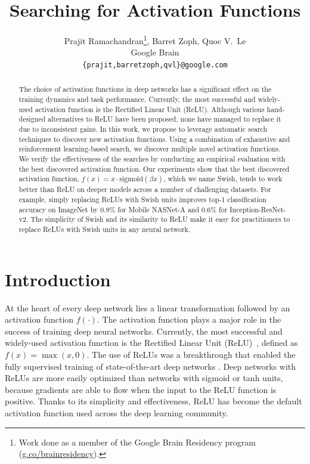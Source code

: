 \documentclass{article} %
\title{Searching for Activation Functions}
\author{Prajit Ramachandran\thanks{Work done as a member of the Google Brain Residency program (\url{g.co/brainresidency}).}, Barret Zoph, Quoc V.~Le  \\
Google Brain \\
\texttt{\{prajit,barretzoph,qvl\}@google.com} \\
}
\begin{document}
\maketitle

\begin{abstract}
The choice of activation functions in deep networks has a significant effect on the training dynamics and task performance. Currently, the most successful and widely-used activation function is the Rectified Linear Unit (ReLU). Although various hand-designed alternatives to ReLU have been proposed, none have managed to replace it due to inconsistent gains. In this work, we propose to leverage automatic search techniques to discover new activation functions. Using a combination of exhaustive and reinforcement learning-based search, we discover multiple novel activation functions. We verify the effectiveness of the searches by conducting an empirical evaluation with the best discovered activation function. Our experiments show that the best discovered activation function, $f(x) = x \cdot \text{sigmoid}(\beta x)$, which we name Swish, tends to work better than ReLU on deeper models across a number of challenging datasets. For example, simply replacing ReLUs with Swish units improves top-1 classification accuracy on ImageNet by 0.9\% for Mobile NASNet-A and 0.6\% for Inception-ResNet-v2. The simplicity of Swish and its similarity to ReLU make it easy for practitioners to replace ReLUs with Swish units in any neural network. 
\end{abstract}

\section{Introduction}
\label{sec:introduction}

At the heart of every deep network lies a linear transformation followed by an activation function $f(\cdot)$. The activation function plays a major role in the success of training deep neural networks. Currently, the most successful and widely-used activation function is the Rectified Linear Unit (ReLU)~\citep{hahnloser2000digital,jarrett2009best,nair2010rectified}, defined as $f(x) = \max(x, 0)$. The use of ReLUs was a breakthrough that enabled the fully supervised training of state-of-the-art deep networks \citep{krizhevsky2012imagenet}. Deep networks with ReLUs are more easily optimized than networks with sigmoid or tanh units, because gradients are able to flow when the input to the ReLU function is positive. Thanks to its simplicity and effectiveness, ReLU has become the default activation function used across the deep learning community.
\end{document}

